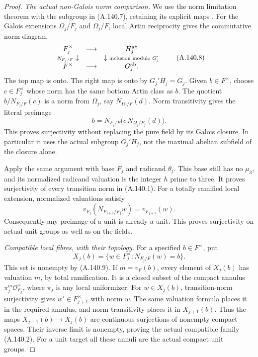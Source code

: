 \begin{proof}
\emph{The actual non-Galois norm comparison.}
We use the norm limitation theorem with
the subgroup in (A.140.7), retaining its
explicit maps
\cite[III, Theorem 3.5]{MilneCFT}.
For the Galois extensions \(\Omega_j/F_j\)
and \(\Omega_j/F\), local Artin reciprocity
gives the commutative norm diagram
\[
 \begin{array}{ccc}
 F_j^\times&\longrightarrow&H_j^{\rm ab}\\
 {\scriptstyle N_{F_j/F}}\downarrow&&
                   \downarrow{\scriptstyle \text{inclusion modulo }G_j'}\\
 F^\times&\longrightarrow&G_j^{\rm ab}.
 \end{array}
\tag{A.140.8}
\]
The top map is onto.
The right map is onto by \(G_j'H_j=G_j\).
Given \(b\in F^\times\), choose
\(c\in F_j^\times\) whose norm has the
same bottom Artin class as \(b\).
The quotient \(b/N_{F_j/F}(c)\) is a norm
from \(\Omega_j\), say \(N_{\Omega_j/F}(d)\).
Norm transitivity gives the literal preimage
\[
       b=N_{F_j/F}\bigl(c\,N_{\Omega_j/F_j}(d)\bigr).
\tag{A.140.9}
\]
This proves surjectivity without replacing
the pure field by its Galois closure.
In particular it uses the actual subgroup
\(G_j'H_j\), not the maximal abelian
subfield of the closure alone.

Apply the same argument with base \(F_j\)
and radicand \(\theta_j\).
This base still has no \(\mu_3\), and its
normalized radicand valuation is the
integer \(h\) prime to three.
It proves surjectivity of every transition
norm in (A.140.1).
For a totally ramified local extension,
normalized valuations satisfy
\[
                 v_{F_j}(N_{F_{j+1}/F_j}w)
                                  =v_{F_{j+1}}(w).
\tag{A.140.10}
\]
Consequently any preimage of a unit is
already a unit.
This proves surjectivity on actual unit
groups as well as on the fields.

\emph{Compatible local fibres, with their topology.}
For a specified \(b\in F^\times\), put
\[
 X_j(b)=\{w\in F_j^\times:
                       N_{F_j/F}(w)=b\}.
\tag{A.140.11}
\]
This set is nonempty by (A.140.9).
If \(m=v_F(b)\), every element of \(X_j(b)\)
has valuation \(m\), by total ramification.
It is a closed subset of the compact annulus
\(\pi_j^m\mathcal O_{F_j}^\times\), where
\(\pi_j\) is any local uniformizer.
For \(w\in X_j(b)\), transition-norm
surjectivity gives \(w'\in F_{j+1}^\times\)
with norm \(w\).
The same valuation formula places it in
the required annulus, and norm transitivity
places it in \(X_{j+1}(b)\).
Thus the maps \(X_{j+1}(b)\to X_j(b)\)
are continuous surjections of nonempty
compact spaces.
Their inverse limit is nonempty, proving
the actual compatible family (A.140.2).
For a unit target all these annuli are
the actual compact unit groups.


\end{proof}
